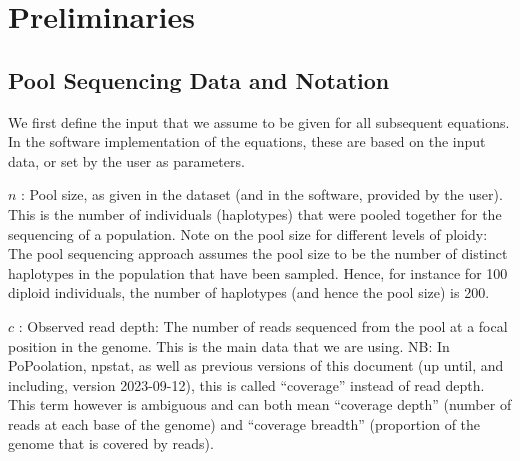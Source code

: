 \documentclass[letterpaper,fontsize=9pt,DIV=12]{scrartcl}
\newcounter{todo}
\newcommand\todo[1]{}
\newcommand\citeay[1]{\citeauthor{#1} (\citeyear{#1}) \cite{#1}}
\newcommand{\samplesize}{n}
\newcommand{\readdepth}{c}
\begin{document}
\pagebreak


\section{Preliminaries}
\label{supp:sec:Definitions}



\subsection{Pool Sequencing Data and Notation}
\label{supp:sec:Definitions:sub:PoolSequencing}

We first define the input that we assume to be given for all subsequent equations.
In the software implementation of the equations, these are based on the input data, or set by the user as parameters.

$\samplesize$ :
Pool size, as given in the dataset (and in the software, provided by the user). This is the number of individuals (haplotypes) that were pooled together for the sequencing of a population. Note on the pool size for different levels of ploidy:  The pool sequencing approach assumes the pool size to be the number of distinct haplotypes in the population that have been sampled. Hence, for instance for 100 diploid individuals, the number of haplotypes (and hence the pool size) is 200.

$\readdepth$ :
Observed read depth: The number of reads sequenced from the pool at a focal position in the genome. This is the main data that we are using. NB: In PoPoolation, npstat, as well as previous versions of this document (up until, and including, version 2023-09-12), this is called ``coverage'' instead of read depth. This term however is ambiguous and can both mean ``coverage depth'' (number of reads at each base of the genome) and ``coverage breadth'' (proportion of the genome that is covered by reads).
\end{document}
